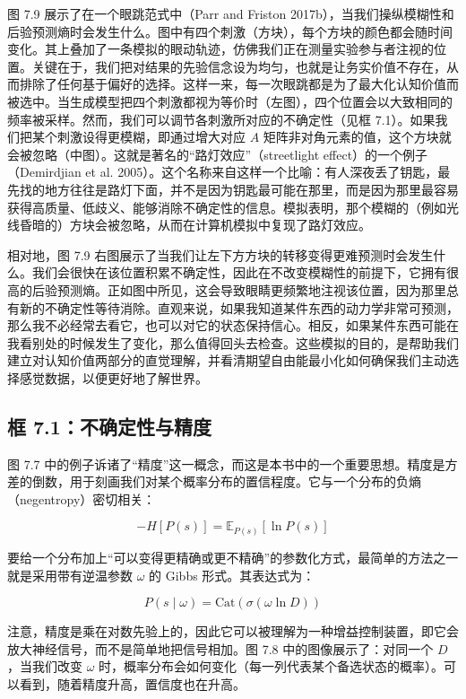 图 7.9 展示了在一个眼跳范式中（Parr and Friston 2017b），当我们操纵模糊性和后验预测熵时会发生什么。图中有四个刺激（方块），每个方块的颜色都会随时间变化。其上叠加了一条模拟的眼动轨迹，仿佛我们正在测量实验参与者注视的位置。关键在于，我们把对结果的先验信念设为均匀，也就是让务实价值不存在，从而排除了任何基于偏好的选择。这样一来，每一次眼跳都是为了最大化认知价值而被选中。当生成模型把四个刺激都视为等价时（左图），四个位置会以大致相同的频率被采样。然而，我们可以调节各刺激所对应的不确定性（见框 7.1）。如果我们把某个刺激设得更模糊，即通过增大对应 $A$ 矩阵非对角元素的值，这个方块就会被忽略（中图）。这就是著名的“路灯效应”（streetlight effect）的一个例子（Demirdjian et al. 2005）。这个名称来自这样一个比喻：有人深夜丢了钥匙，最先找的地方往往是路灯下面，并不是因为钥匙最可能在那里，而是因为那里最容易获得高质量、低歧义、能够消除不确定性的信息。模拟表明，那个模糊的（例如光线昏暗的）方块会被忽略，从而在计算机模拟中复现了路灯效应。

相对地，图 7.9 右图展示了当我们让左下方方块的转移变得更难预测时会发生什么。我们会很快在该位置积累不确定性，因此在不改变模糊性的前提下，它拥有很高的后验预测熵。正如图中所见，这会导致眼睛更频繁地注视该位置，因为那里总有新的不确定性等待消除。直观来说，如果我知道某件东西的动力学非常可预测，那么我不必经常去看它，也可以对它的状态保持信心。相反，如果某件东西可能在我看别处的时候发生了变化，那么值得回头去检查。这些模拟的目的，是帮助我们建立对认知价值两部分的直觉理解，并看清期望自由能最小化如何确保我们主动选择感觉数据，以便更好地了解世界。

\subsection*{框 7.1：不确定性与精度}

图 7.7 中的例子诉诸了“精度”这一概念，而这是本书中的一个重要思想。精度是方差的倒数，用于刻画我们对某个概率分布的置信程度。它与一个分布的负熵（negentropy）密切相关：

\begin{equation}
-H[P(s)] = \mathbb{E}_{P(s)}[\ln P(s)]
\end{equation}

要给一个分布加上“可以变得更精确或更不精确”的参数化方式，最简单的方法之一就是采用带有逆温参数 $\omega$ 的 Gibbs 形式。其表达式为：

\begin{equation}
P(s\mid \omega)=\mathrm{Cat}(\sigma(\omega \ln D))
\end{equation}

注意，精度是乘在对数先验上的，因此它可以被理解为一种增益控制装置，即它会放大神经信号，而不是简单地把信号相加。图 7.8 中的图像展示了：对同一个 $D$，当我们改变 $\omega$ 时，概率分布会如何变化（每一列代表某个备选状态的概率）。可以看到，随着精度升高，置信度也在升高。

